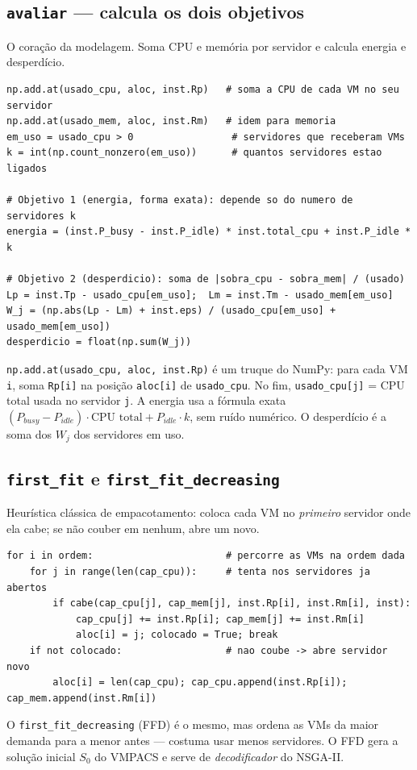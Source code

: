 \documentclass[11pt]{article}
\begin{document}
\subsection{\texttt{avaliar} --- calcula os dois objetivos}
O coração da modelagem. Soma CPU e memória por servidor e calcula energia e
desperdício.
\begin{lstlisting}
np.add.at(usado_cpu, aloc, inst.Rp)   # soma a CPU de cada VM no seu servidor
np.add.at(usado_mem, aloc, inst.Rm)   # idem para memoria
em_uso = usado_cpu > 0                 # servidores que receberam VMs
k = int(np.count_nonzero(em_uso))      # quantos servidores estao ligados

# Objetivo 1 (energia, forma exata): depende so do numero de servidores k
energia = (inst.P_busy - inst.P_idle) * inst.total_cpu + inst.P_idle * k

# Objetivo 2 (desperdicio): soma de |sobra_cpu - sobra_mem| / (usado)
Lp = inst.Tp - usado_cpu[em_uso];  Lm = inst.Tm - usado_mem[em_uso]
W_j = (np.abs(Lp - Lm) + inst.eps) / (usado_cpu[em_uso] + usado_mem[em_uso])
desperdicio = float(np.sum(W_j))
\end{lstlisting}
\begin{ideia}
\texttt{np.add.at(usado\_cpu, aloc, inst.Rp)} é um truque do NumPy: para cada VM
\texttt{i}, soma \texttt{Rp[i]} na posição \texttt{aloc[i]} de \texttt{usado\_cpu}.
No fim, \texttt{usado\_cpu[j]} = CPU total usada no servidor \texttt{j}. A energia
usa a fórmula exata $(P_{busy}-P_{idle})\cdot\text{CPU total}+P_{idle}\cdot k$,
sem ruído numérico. O desperdício é a soma dos $W_j$ dos servidores em uso.
\end{ideia}

\subsection{\texttt{first\_fit} e \texttt{first\_fit\_decreasing}}
Heurística clássica de empacotamento: coloca cada VM no \emph{primeiro} servidor
onde ela cabe; se não couber em nenhum, abre um novo.
\begin{lstlisting}
for i in ordem:                       # percorre as VMs na ordem dada
    for j in range(len(cap_cpu)):     # tenta nos servidores ja abertos
        if cabe(cap_cpu[j], cap_mem[j], inst.Rp[i], inst.Rm[i], inst):
            cap_cpu[j] += inst.Rp[i]; cap_mem[j] += inst.Rm[i]
            aloc[i] = j; colocado = True; break
    if not colocado:                  # nao coube -> abre servidor novo
        aloc[i] = len(cap_cpu); cap_cpu.append(inst.Rp[i]); cap_mem.append(inst.Rm[i])
\end{lstlisting}
O \texttt{first\_fit\_decreasing} (FFD) é o mesmo, mas ordena as VMs da maior
demanda para a menor antes — costuma usar menos servidores. O FFD gera a solução
inicial $S_0$ do VMPACS e serve de \emph{decodificador} do NSGA-II.
\end{document}
